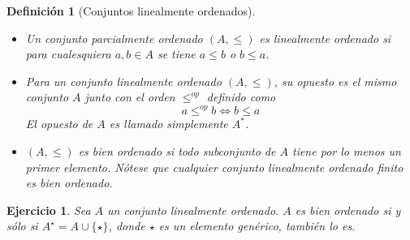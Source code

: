\documentclass[12pt,letterpaper,titlepage]{article}
\newtheorem*{defn}{Definición}
\newtheorem{exe}{Ejercicio}
\theoremstyle{definition}
\newcommand\<{\langle}
\renewcommand\>{\rangle}
\begin{document}
\begin{defn}[Conjuntos linealmente ordenados]
\leavevmode
\begin{itemize}
  \item Un conjunto parcialmente ordenado $(A,\leq)$ es linealmente ordenado si para cualesquiera $a,b\in A$ se tiene $a\leq b$ o $b\leq a$. 

\item Para un conjunto linealmente ordenado $(A,\leq)$, su opuesto es el mismo conjunto $A$ junto con el orden $\leq^{op}$ definido como 
$$a\leq^{op}b\iff b\leq a$$
El opuesto de $A$ es llamado simplemente $A^*$.
\item $(A,\leq)$ es bien ordenado si todo subconjunto de $A$ tiene por lo menos un primer elemento. Nótese que cualquier conjunto linealmente ordenado finito es bien ordenado.
\end{itemize} 
\end{defn}
\begin{exe}%
    \label{exe:sucesor}
  Sea $A$ un conjunto linealmente ordenado. $A$ es bien ordenado si y sólo si $A^{\star}=A\cup \{\star\}$, donde $\star$ es un elemento genérico, también lo es.
\end{exe}
\end{document}
